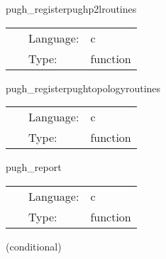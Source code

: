 \documentclass{article}
\begin{document}
\vspace{5mm}


\hspace{5mm} pugh\_registerpughp2lroutines 

\hspace{5mm}{\it register physical to logical process mapping routines } 


\hspace{5mm}

 \begin{tabular*}{160mm}{cll} 
~ & Language:  & c \\ 
~ & Type:  & function \\ 
\end{tabular*} 


\vspace{5mm}


\hspace{5mm} pugh\_registerpughtopologyroutines 

\hspace{5mm}{\it register topology generation routines routines } 


\hspace{5mm}

 \begin{tabular*}{160mm}{cll} 
~ & Language:  & c \\ 
~ & Type:  & function \\ 
\end{tabular*} 


\vspace{5mm}


\hspace{5mm} pugh\_report 

\hspace{5mm}{\it report on pugh set up } 


\hspace{5mm}

 \begin{tabular*}{160mm}{cll} 
~ & Language:  & c \\ 
~ & Type:  & function \\ 
\end{tabular*} 


\vspace{5mm}

   (conditional) 
\end{document}
